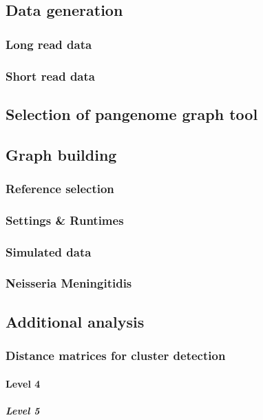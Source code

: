 
\subsection{Data generation}
\subsubsection{Long read data}
\subsubsection{Short read data}

\subsection{Selection of pangenome graph tool}

\subsection{Graph building}
\subsubsection{Reference selection}
\subsubsection{Settings & Runtimes}
\subsubsection{Simulated data}
\subsubsection{Neisseria Meningitidis}

\subsection{Additional analysis}
\subsubsection{Distance matrices for cluster detection}




\paragraph{Level 4}
\subparagraph{Level 5}
